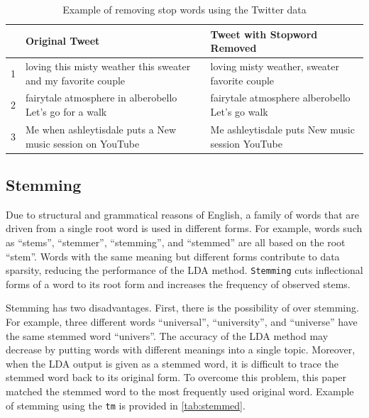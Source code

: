 \documentclass[]{article}
\begin{document}

\begin{table}[ht]
\centering
\begin{tabular}{rll}
  \hline
 & Original Tweet & Tweet with Stopword Removed \\ 
  \hline
1 & loving this misty weather this sweater and my favorite couple & loving misty weather, sweater favorite couple\\ 
  2 & fairytale atmosphere in alberobello Let's go for a walk& fairytale atmosphere alberobello Let's go walk\\ 
  3 & Me when ashleytisdale puts a New music session on YouTube & Me ashleytisdale puts New music session YouTube\\ 
   \hline
\end{tabular}
\caption{Example of removing stop words using the Twitter data}
\label{tab:stopword}
\end{table}

\subsection{Stemming}\label{stemming}

Due to structural and grammatical reasons of English, a family of words
that are driven from a single root word is used in different forms. For
example, words such as ``stems'', ``stemmer'', ``stemming'', and
``stemmed'' are all based on the root ``stem''. Words with the same
meaning but different forms contribute to data sparsity, reducing the
performance of the LDA method. \texttt{Stemming} cuts inflectional forms
of a word to its root form and increases the frequency of observed
stems.

Stemming has two disadvantages. First, there is the possibility of over
stemming. For example, three different words ``universal'',
``university'', and ``universe'' have the same stemmed word ``univers''.
The accuracy of the LDA method may decrease by putting words with
different meanings into a single topic. Moreover, when the LDA output is
given as a stemmed word, it is difficult to trace the stemmed word back
to its original form. To overcome this problem, this paper matched the
stemmed word to the most frequently used original word. Example of
stemming using the \texttt{tm} is provided in \autoref{tab:stemmed}.

\end{document}
